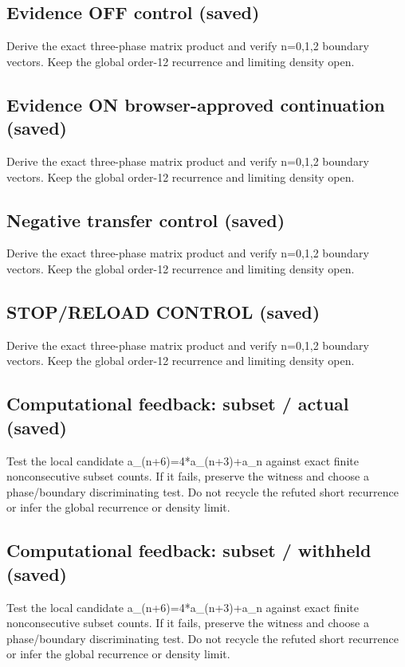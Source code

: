 \documentclass[11pt]{article}
\begin{document}
\subsection{Evidence OFF control (saved)}
Derive the exact three-phase matrix product and verify n=0,1,2 boundary vectors. Keep the global order-12 recurrence and limiting density open.\par
\subsection{Evidence ON browser-approved continuation (saved)}
Derive the exact three-phase matrix product and verify n=0,1,2 boundary vectors. Keep the global order-12 recurrence and limiting density open.\par
\subsection{Negative transfer control (saved)}
Derive the exact three-phase matrix product and verify n=0,1,2 boundary vectors. Keep the global order-12 recurrence and limiting density open.\par
\subsection{STOP/RELOAD CONTROL (saved)}
Derive the exact three-phase matrix product and verify n=0,1,2 boundary vectors. Keep the global order-12 recurrence and limiting density open.\par
\subsection{Computational feedback: subset / actual (saved)}
Test the local candidate a\_(n+6)=4*a\_(n+3)+a\_n against exact finite nonconsecutive subset counts. If it fails, preserve the witness and choose a phase/boundary discriminating test. Do not recycle the refuted short recurrence or infer the global recurrence or density limit.\par
\subsection{Computational feedback: subset / withheld (saved)}
Test the local candidate a\_(n+6)=4*a\_(n+3)+a\_n against exact finite nonconsecutive subset counts. If it fails, preserve the witness and choose a phase/boundary discriminating test. Do not recycle the refuted short recurrence or infer the global recurrence or density limit.\par
\end{document}
